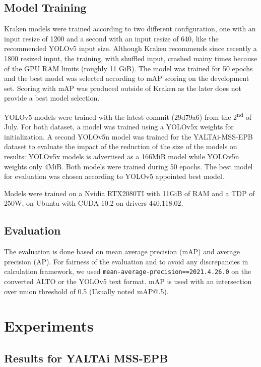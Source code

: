\documentclass{jdmdh}
\begin{document}
\subsection{Model Training}

Kraken models were trained according to two different configuration, one with an input resize of 1200 and a second with an input resize of 640, like the recommended YOLOv5 input size. Although Kraken recommends since recently a 1800 resized input, the training, with shuffled input, crashed mainy times because of the GPU RAM limits (roughly 11 GiB). The model was trained for 50 epochs and the best model was selected according to mAP scoring on the development set. Scoring with mAP was produced outside of Kraken as the later does not provide a best model selection.

YOLOv5 models were trained with the latest commit (29d79a6) from the 2\textsuperscript{nd} of July. For both dataset, a model was trained using a YOLOv5x weights for initialization. A second YOLOv5n model was trained for the YALTAi-MSS-EPB dataset to evaluate the impact of the reduction of the size of the models on results: YOLOv5x models is advertised as a 166MiB model while YOLOv5n weights only 4MiB. Both models were trained during 50 epochs. The best model for evaluation was chosen according to YOLOv5 appointed best model.

Models were trained on a Nvidia RTX2080TI with 11GiB of RAM and a TDP of 250W, on Ubuntu with CUDA 10.2 on drivers 440.118.02.

\subsection{Evaluation}

The evaluation is done based on mean average precision (mAP) and average precision (AP). For fairness of the evaluation and to avoid any discrepancies in calculation framework, we used \texttt{mean-average-precision==2021.4.26.0} on the converted ALTO or the YOLOv5 text format. mAP is used with an intersection over union threshold of 0.5 (Usually noted mAP@.5).

\section{Experiments}

\subsection{Results for YALTAi MSS-EPB}
\end{document}
